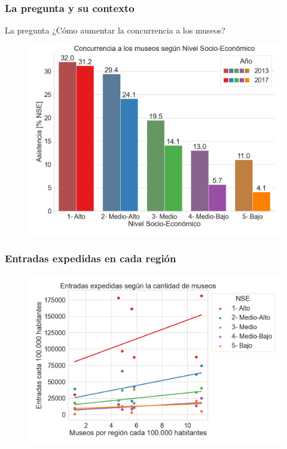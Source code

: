 \documentclass{beamer}
\begin{document}
\begin{frame}
\frametitle{La pregunta y su contexto}

\begin{block}{La pregunta}
¿Cómo aumentar la concurrencia a los museos?
\end{block}

\begin{figure}
\centering
\includegraphics[height=0.6\textheight]{asist_museo_nse_x100}
\label{fig:asist_museo_nse}
\end{figure}

\end{frame}

\begin{frame}
\frametitle{Entradas expedidas en cada región}

\begin{figure}
\centering
\includegraphics[width=\textwidth]{modelo_entrada_museo}
\label{fig:modelo_entrada_museo}
\end{figure}

\end{frame}
\end{document}
